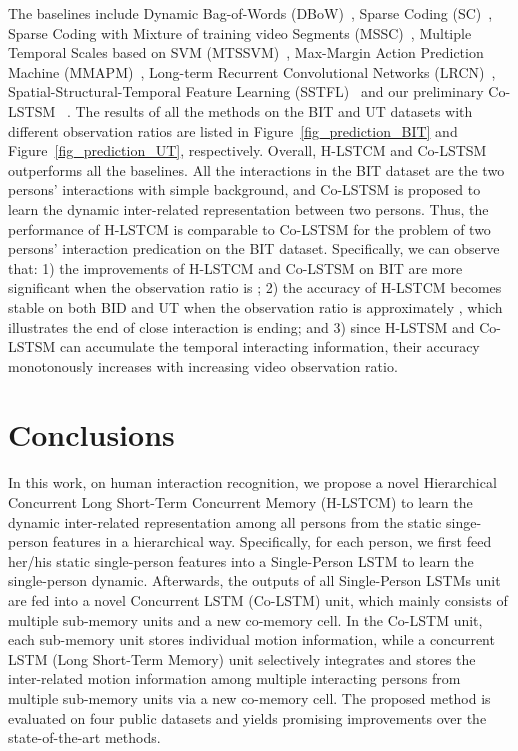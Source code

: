 \documentclass[9pt,journal,letterpaper,twocolumn]{IEEEtran}
\begin{document}
	The baselines include Dynamic
	Bag-of-Words (DBoW)~\cite{ryoo2011human}, Sparse Coding (SC)~\cite{cao2013recognize}, Sparse Coding with Mixture
	of training video Segments (MSSC)~\cite{cao2013recognize}, Multiple Temporal Scales based on SVM (MTSSVM)~\cite{kong2014a}, Max-Margin Action Prediction Machine (MMAPM)~\cite{kong2014max}, Long-term Recurrent Convolutional Networks (LRCN)~\cite{donahue2015long}, Spatial-Structural-Temporal Feature Learning (SSTFL)~\cite{ke2016spatial} and our preliminary Co-LSTSM ~\cite{shu2017concurrence}. The results of all the methods on the BIT and UT datasets with different observation ratios are listed
	in Figure~\ref{fig_prediction_BIT} and Figure~\ref{fig_prediction_UT}, respectively. Overall, H-LSTCM and Co-LSTSM outperforms all the baselines. All the interactions in the BIT dataset are the two persons’ interactions with simple background, and Co-LSTSM is proposed to learn the dynamic inter-related representation between two persons. Thus, the performance of H-LSTCM is comparable to Co-LSTSM for the problem of two persons’ interaction predication on the BIT dataset. Specifically, we can observe that: 1) the improvements of H-LSTCM and Co-LSTSM on BIT are more significant when the observation ratio is ; 2) the accuracy of H-LSTCM becomes stable on both BID and UT when the observation ratio is approximately , which illustrates the end of close interaction is ending; and 3) since H-LSTSM and Co-LSTSM can accumulate the temporal interacting information, their accuracy monotonously increases with increasing video observation ratio. 
	
	

	
	


\vspace{-0mm}
	\section{Conclusions}
	\label{C}
	

	
	In this work, on human interaction recognition, we propose a novel Hierarchical Concurrent Long Short-Term Concurrent Memory (H-LSTCM) to learn the dynamic inter-related representation among all persons from the static singe-person features in a hierarchical way. Specifically, for each person, we first feed her/his static single-person features into a Single-Person LSTM to learn the single-person dynamic. Afterwards, the outputs of all Single-Person LSTMs unit are fed into a novel Concurrent LSTM (Co-LSTM) unit, which mainly consists of multiple sub-memory units and a new co-memory cell. In the Co-LSTM unit, each sub-memory unit stores individual motion information, while a concurrent LSTM (Long Short-Term Memory) unit selectively integrates and stores the inter-related motion information among multiple interacting persons from multiple sub-memory units via a new co-memory cell. The proposed method is evaluated on four public datasets and yields promising improvements over the state-of-the-art methods. 


	
	




\vspace{-1mm}
	

	
	
	
\end{document}
